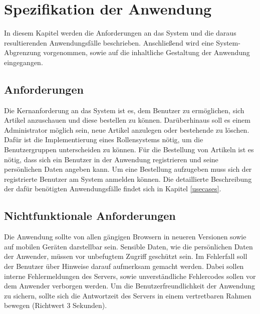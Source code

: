 \section{Spezifikation der Anwendung}
In diesem Kapitel werden die Anforderungen an das System und die daraus resultierenden Anwendungsfälle beschrieben.
Anschließend wird eine System-Abgrenzung vorgenommen, sowie auf die inhaltliche Gestaltung der Anwendung eingegangen.
\subsection{Anforderungen}
Die Kernanforderung an das System ist es, dem Benutzer zu ermöglichen, sich Artikel anzuschauen und diese bestellen zu können.
Darüberhinaus soll es einem Administrator möglich sein, neue Artikel anzulegen oder bestehende zu löschen.
Dafür ist die Implementierung eines Rollensystems nötig, um die Benutzergruppen unterscheiden zu können.
Für die Bestellung von Artikeln ist es nötig, dass sich ein Benutzer in der Anwendung registrieren und seine persönlichen Daten angeben kann.
Um eine Bestellung aufzugeben muss sich der registrierte Benutzer am System anmelden können.
Die detaillierte Beschreibung der dafür benötigten Anwendungsfälle findet sich in Kapitel \ref{usecases}.
\subsection{Nichtfunktionale Anforderungen}
Die Anwendung sollte von allen gängigen Browsern in neueren Versionen sowie auf mobilen Geräten darstellbar sein.
Sensible Daten, wie die persönlichen Daten der Anwender, müssen vor unbefugtem Zugriff geschützt sein.
Im Fehlerfall soll der Benutzer über Hinweise darauf aufmerksam gemacht werden.
Dabei sollen interne Fehlermeldungen des Servers, sowie unverständliche Fehlercodes sollen vor dem Anwender verborgen werden.
Um die Benutzerfreundlichkeit der Anwendung zu sichern, sollte sich die Antwortzeit des Servers in einem vertretbaren Rahmen bewegen (Richtwert 3 Sekunden).
